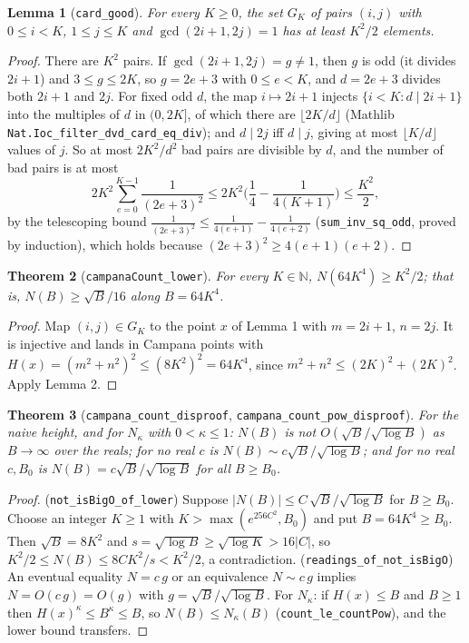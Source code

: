 \documentclass[11pt]{article}
\newtheorem{theorem}{Theorem}
\newtheorem{lemma}[theorem]{Lemma}
\theoremstyle{definition}
\begin{document}
\begin{lemma}[\texttt{card\_good}]
For every $K\ge0$, the set $G_K$ of pairs $(i,j)$ with $0\le i<K$, $1\le j\le K$ and
$\gcd(2i+1,2j)=1$ has at least $K^2/2$ elements.
\end{lemma}

\begin{proof}
There are $K^2$ pairs. If $\gcd(2i+1,2j)=g\neq1$, then $g$ is odd (it divides $2i+1$) and
$3\le g\le 2K$, so $g=2e+3$ with $0\le e<K$, and $d=2e+3$ divides both $2i+1$ and $2j$. For fixed odd
$d$, the map $i\mapsto 2i+1$ injects $\{i<K: d\mid 2i+1\}$ into the multiples of $d$ in $(0,2K]$, of
which there are $\lfloor 2K/d\rfloor$ (Mathlib \texttt{Nat.Ioc\_filter\_dvd\_card\_eq\_div}); and
$d\mid 2j$ iff $d\mid j$, giving at most $\lfloor K/d\rfloor$ values of $j$. So at most
$2K^2/d^2$ bad pairs are divisible by $d$, and the number of bad pairs is at most
\[
2K^2\sum_{e=0}^{K-1}\frac{1}{(2e+3)^2}\le 2K^2\Big(\frac14-\frac1{4(K+1)}\Big)\le \frac{K^2}{2},
\]
by the telescoping bound $\frac1{(2e+3)^2}\le\frac1{4(e+1)}-\frac1{4(e+2)}$ (\texttt{sum\_inv\_sq\_odd},
proved by induction), which holds because $(2e+3)^2\ge 4(e+1)(e+2)$.
\end{proof}

\begin{theorem}[\texttt{campanaCount\_lower}]
For every $K\in\mathbb{N}$, $N(64K^4)\ge K^2/2$; that is, $N(B)\ge\sqrt B/16$ along $B=64K^4$.
\end{theorem}

\begin{proof}
Map $(i,j)\in G_K$ to the point $x$ of Lemma 1 with $m=2i+1$, $n=2j$. It is injective and lands in
Campana points with $H(x)=(m^2+n^2)^2\le (8K^2)^2=64K^4$, since $m^2+n^2\le(2K)^2+(2K)^2$. Apply
Lemma 2.
\end{proof}

\begin{theorem}[\texttt{campana\_count\_disproof}, \texttt{campana\_count\_pow\_disproof}]
For the naive height, and for $N_\kappa$ with $0<\kappa\le1$: $N(B)$ is not $O(\sqrt B/\sqrt{\log B})$
as $B\to\infty$ over the reals; for no real $c$ is $N(B)\sim c\sqrt B/\sqrt{\log B}$; and for no real
$c,B_0$ is $N(B)=c\sqrt B/\sqrt{\log B}$ for all $B\ge B_0$.
\end{theorem}

\begin{proof}
(\texttt{not\_isBigO\_of\_lower}) Suppose $|N(B)|\le C\,\sqrt B/\sqrt{\log B}$ for $B\ge B_0$. Choose
an integer $K\ge 1$ with $K>\max(e^{256C^2},B_0)$ and put $B=64K^4\ge B_0$. Then $\sqrt B=8K^2$ and
$s=\sqrt{\log B}\ge\sqrt{\log K}>16|C|$, so $K^2/2\le N(B)\le 8CK^2/s<K^2/2$, a contradiction.
(\texttt{readings\_of\_not\_isBigO}) An eventual equality $N=c\,g$ or an equivalence $N\sim c\,g$
implies $N=O(c\,g)=O(g)$ with $g=\sqrt B/\sqrt{\log B}$. For $N_\kappa$: if $H(x)\le B$ and $B\ge1$ then
$H(x)^\kappa\le B^\kappa\le B$, so $N(B)\le N_\kappa(B)$ (\texttt{count\_le\_countPow}), and the lower
bound transfers.
\end{proof}
\end{document}

